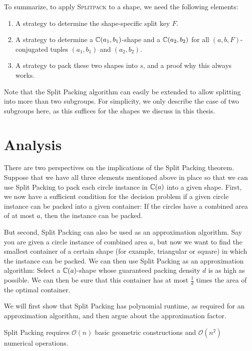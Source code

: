 \documentclass[a4paper,style=print,bibliography=totoc,nexus,lnum,extramargin]{tubsbook}
\begin{document}
To summarize, to apply \textsc{Splitpack} to a shape, we need the following elements:

\begin{enumerate}
    \item A strategy to determine the shape-specific split key $F$.
    \item A strategy to determine a $\mathbb{C}(a_1, b_1)$-shape and a $\mathbb{C}(a_2, b_2)$ for all $(a,b,F)$-conjugated tuples $(a_1, b_1)$ and $(a_2, b_2)$.
    \item A strategy to pack these two shapes into $s$, and a proof why this always works.
\end{enumerate}

Note that the Split Packing algorithm can easily be extended to allow splitting into more than two subgroups. For simplicity, we only describe the case of two subgroups here, as this suffices for the shapes we discuss in this thesis.

\section{Analysis}

There are two perspectives on the implications of the Split Packing theorem. Suppose that we have all three elements mentioned above in place so that we can use Split Packing to pack each circle instance in $\mathbb{C}(a)$ into a given shape.
First, we now have a sufficient condition for the decision problem if a given circle instance can be packed into a given container: If the circles have a combined area of at most $a$, then the instance can be packed.

But second, Split Packing can also be used as an approximation algorithm. Say you are given a circle instance of combined area $a$, but now we want to find the smallest container of a certain shape (for example, triangular or square) in which the instance can be packed. We can then use Split Packing as an approximation algorithm: Select a $\mathbb{C}(a)$-shape whose guaranteed packing density $d$ is as high as possible. We can then be sure that this container has at most $\frac{1}{d}$ times the area of the optimal container.

We will first show that Split Packing has polynomial runtime, as required for an approximation algorithm, and then argue about the approximation factor.

\begin{theorem}
    Split Packing requires $\mathcal{O}(n)$ basic geometric constructions and $\mathcal{O}(n^2)$ numerical operations.
\end{theorem}
\end{document}
